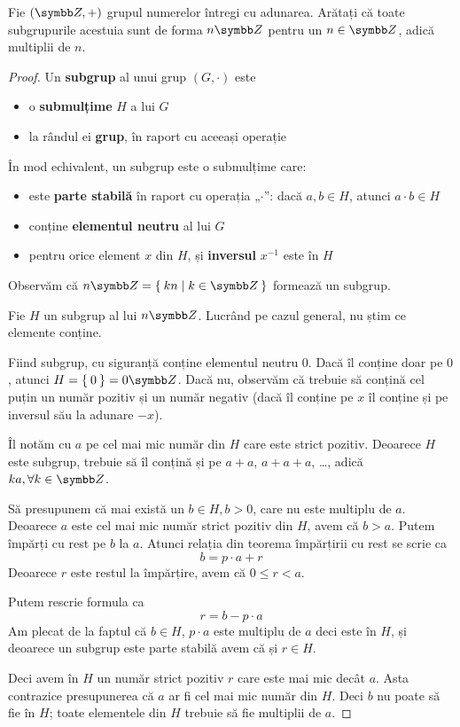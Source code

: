\begin{exercise}
Fie \((\integers, +)\) grupul numerelor întregi cu adunarea. Arătați că toate subgrupurile acestuia sunt de forma \(n \integers\) pentru un \(n \in \integers\), adică multiplii de \(n\).
\end{exercise}
\begin{proof}
Un \textbf{subgrup} al unui grup \((G, \cdot)\) este
\begin{itemize}
    \item o \textbf{submulțime} \(H\) a lui \(G\)
    \item la rândul ei \textbf{grup}, în raport cu aceeași operație
\end{itemize}

În mod echivalent, un subgrup este o submulțime care:
\begin{itemize}
    \item este \textbf{parte stabilă} în raport cu operația „\(\cdot\)”: dacă \(a, b \in H\), atunci \(a \cdot b \in H\)
    \item conține \textbf{elementul neutru} al lui \(G\)
    \item pentru orice element \(x\) din \(H\), și \textbf{inversul} \(x^{-1}\) este în \(H\)
\end{itemize}

Observăm că \(n \integers = \Set{ k n | k \in \integers }\) formează un subgrup.

Fie \(H\) un subgrup al lui \(n \integers\). Lucrând pe cazul general, nu știm ce elemente conține.

Fiind subgrup, cu siguranță conține elementul neutru \(0\). Dacă îl conține doar pe \(0\), atunci \(H = \Set{ 0 } = 0 \integers\). Dacă nu, observăm că trebuie să conțină cel puțin un număr pozitiv și un număr negativ (dacă îl conține pe \(x\) îl conține și pe inversul său la adunare \(-x\)).

Îl notăm cu \(a\) pe cel mai mic număr din \(H\) care este strict pozitiv. Deoarece \(H\) este subgrup, trebuie să îl conțină și pe \(a + a\), \(a + a + a\), \dots, adică \(k a, \forall k \in \integers\).

Să presupunem că mai există un \(b \in H, b > 0\), care nu este multiplu de \(a\). Deoarece \(a\) este cel mai mic număr strict pozitiv din \(H\), avem că \(b > a\). Putem împărți cu rest pe \(b\) la \(a\). Atunci relația din teorema împărțirii cu rest se scrie ca
\[
    b = p \cdot a + r
\]
Deoarece \(r\) este restul la împărțire, avem că \(0 \leq r < a\).

Putem rescrie formula ca
\[
    r = b - p \cdot a
\]
Am plecat de la faptul că \(b \in H\), \(p \cdot a\) este multiplu de \(a\) deci este în \(H\), și deoarece un subgrup este parte stabilă avem că și \(r \in H\).

Deci avem în \(H\) un număr strict pozitiv \(r\) care este mai mic decât \(a\). Asta contrazice presupunerea că \(a\) ar fi cel mai mic număr din \(H\). Deci \(b\) nu poate să fie în \(H\); toate elementele din \(H\) trebuie să fie multiplii de \(a\).
\end{proof}
